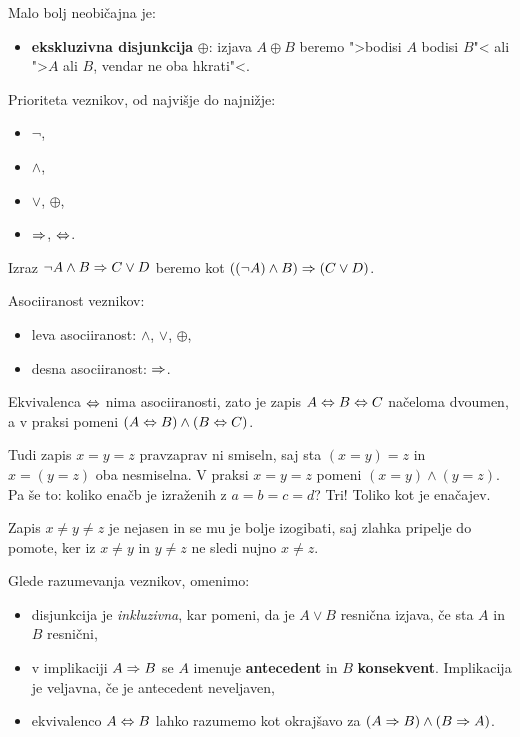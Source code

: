 %
Malo bolj neobičajna je:
%
\begin{itemize}
\item \textbf{ekskluzivna disjunkcija} $\oplus$: izjava $A \oplus B$ beremo ">bodisi $A$ bodisi $B$"< ali ">$A$ ali $B$, vendar ne oba hkrati"<.
\end{itemize}
%
Prioriteta veznikov, od najvišje do najnižje:
%
\begin{itemize}
\item $\neg$,
\item $\land$,
\item $\lor$, $\oplus$,
\item $\Rightarrow$, $\Leftrightarrow$.
\end{itemize}

\begin{zgled}
  Izraz $\neg A \land B \Rightarrow C \lor D$ beremo kot $((\neg  A) \land B) \Rightarrow (C \lor D)$.
\end{zgled}

Asociiranost veznikov:
%
\begin{itemize}
\item leva asociiranost: $\land$, $\lor$, $\oplus$,
\item desna asociiranost: $\Rightarrow$.
\end{itemize}
%
Ekvivalenca $\Leftrightarrow$ nima asociiranosti, zato je zapis $A \Leftrightarrow B \Leftrightarrow C$ načeloma dvoumen, a v praksi pomeni $(A \Leftrightarrow B) \land (B \Leftrightarrow C)$.

\begin{opomba}
  Tudi zapis $x = y = z$ pravzaprav ni smiseln, saj sta $(x = y) = z$ in $x = (y = z)$ oba nesmiselna. V praksi $x = y = z$ pomeni $(x = y) \land (y = z)$. Pa še to: koliko enačb je izraženih z $a = b = c = d$? Tri! Toliko kot je enačajev.
\end{opomba}

\begin{opomba}
  Zapis $x \neq y \neq z$ je nejasen in se mu je bolje izogibati, saj zlahka pripelje do pomote, ker iz $x
  \neq y$ in $y \neq z$ ne sledi nujno $x \neq z$.
\end{opomba}

Glede razumevanja veznikov, omenimo:
%
\begin{itemize}
\item disjunkcija je \emph{inkluzivna}, kar pomeni, da je $A \lor B$ resnična izjava, če sta $A$ in $B$ resnični,
\item v implikaciji $A \Rightarrow B$ se $A$ imenuje \textbf{antecedent} in $B$ \textbf{konsekvent}. Implikacija je veljavna, če je antecedent neveljaven,
\item ekvivalenco $A \Leftrightarrow B$ lahko razumemo kot okrajšavo za $(A \Rightarrow B) \land (B \Rightarrow A)$.
\end{itemize}

